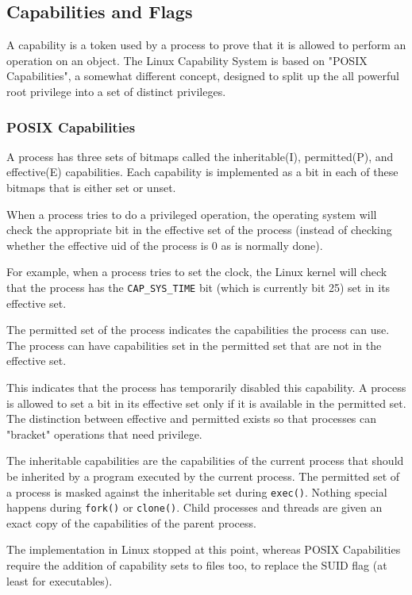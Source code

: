 \subsection{Capabilities and Flags}

A capability is a token used by a process to prove that it is allowed to
perform an operation on an object. The Linux Capability System is based on
"POSIX Capabilities", a somewhat different concept, designed to split up the
all powerful root privilege into a set of distinct privileges.

\subsubsection{POSIX Capabilities}

A process has three sets of bitmaps called the inheritable(I), permitted(P),
and effective(E) capabilities. Each capability is implemented as a bit in each
of these bitmaps that is either set or unset.

When a process tries to do a privileged operation, the operating system will
check the appropriate bit in the effective set of the process (instead of
checking whether the effective uid of the process is 0 as is normally done).

For example, when a process tries to set the clock, the Linux kernel will check
that the process has the \verb,CAP_SYS_TIME, bit (which is currently bit 25)
set in its effective set.

The permitted set of the process indicates the capabilities the process can
use. The process can have capabilities set in the permitted set that are not in
the effective set.

This indicates that the process has temporarily disabled this capability. A
process is allowed to set a bit in its effective set only if it is available in
the permitted set. The distinction between effective and permitted exists so
that processes can "bracket" operations that need privilege.

The inheritable capabilities are the capabilities of the current process that
should be inherited by a program executed by the current process. The permitted
set of a process is masked against the inheritable set during \verb,exec(),.
Nothing special happens during \verb,fork(), or \verb,clone(),. Child processes
and threads are given an exact copy of the capabilities of the parent process.

The implementation in Linux stopped at this point, whereas POSIX Capabilities
require the addition of capability sets to files too, to replace the SUID flag
(at least for executables).

